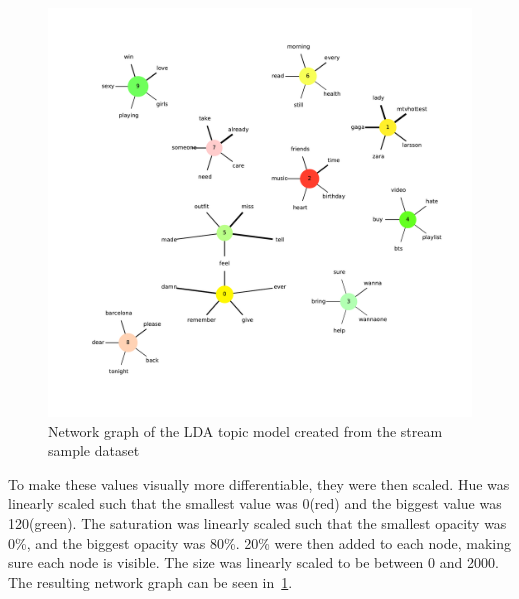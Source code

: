 \begin{figure}
    \centering
    \caption{Network graph of the LDA topic model created from the stream sample dataset}
    \label{fig:combined_network_graph}
    \includegraphics[width=\textwidth]{../figures/combined_network_graph.pdf}
\end{figure}

To make these values visually more differentiable, they were then scaled.
Hue was linearly scaled such that the smallest value was 0\degree (red) and the biggest value was 120\degree (green).
The saturation was linearly scaled such that the smallest opacity was 0\%,
and the biggest opacity was 80\%.
20\% were then added to each node, making sure each node is visible.
The size was linearly scaled to be between 0 and 2000.
The resulting network graph can be seen in~\cref{fig:combined_network_graph}.

